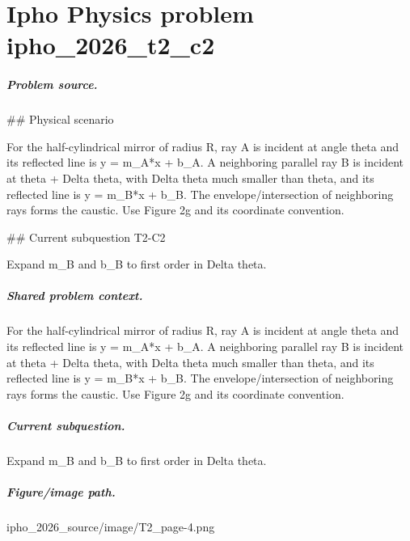 
\chapter{Ipho Physics problem ipho\_2026\_t2\_c2}
\label{ch:IPhO2026Problems_problem_ipho_2026_t2_c2}

\paragraph{Problem source.}
\#\# Physical scenario

For the half-cylindrical mirror of radius R, ray A is incident at angle theta
and its reflected line is y = m\_A*x + b\_A.  A neighboring parallel ray B is
incident at theta + Delta theta, with Delta theta much smaller than theta, and
its reflected line is y = m\_B*x + b\_B.  The envelope/intersection of neighboring
rays forms the caustic.  Use Figure 2g and its coordinate convention.

\#\# Current subquestion T2-C2

Expand m\_B and b\_B to first order in Delta theta.

\paragraph{Shared problem context.}
For the half-cylindrical mirror of radius R, ray A is incident at angle theta
and its reflected line is y = m\_A*x + b\_A.  A neighboring parallel ray B is
incident at theta + Delta theta, with Delta theta much smaller than theta, and
its reflected line is y = m\_B*x + b\_B.  The envelope/intersection of neighboring
rays forms the caustic.  Use Figure 2g and its coordinate convention.

\paragraph{Current subquestion.}
Expand m\_B and b\_B to first order in Delta theta.

\paragraph{Figure/image path.}
ipho\_2026\_source/image/T2\_page-4.png

